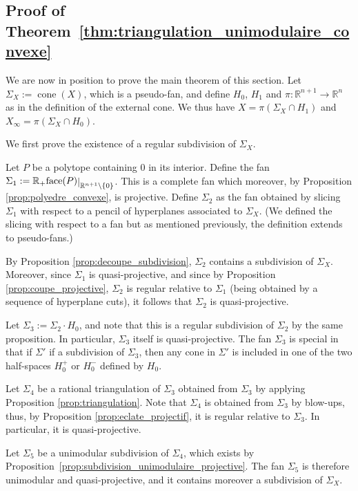\documentclass[11pt]{amsart}
\theoremstyle{definition}
\numberwithin{equation}{section}
\renewcommand{\~}{\widetilde}
\newcommand{\R}{\mathbb{R}}
\newcommand{\rest}[1]{\raisebox{-1pt}{$\vert$}_{#1}}
\newcommand{\cone}{\R_+} %
\DeclareMathOperator{\coneupop}{cone}
\newcommand{\coneup}[1]{\coneupop(#1)} %
\DeclareMathOperator{\faceop}{face}
\newcommand{\face}[1]{\faceop(#1)} %
\begin{document}
\subsection{Proof of Theorem~\ref{thm:triangulation_unimodulaire_convexe}}
We are now in position to prove the main theorem of this section. Let $\Sigma_X:=\coneup{X}$, which is a pseudo-fan, and define $H_0$, $H_1$ and $\pi\colon\R^{n+1}\to\R^n$ as in the definition of the external cone. We thus have $X=\pi(\Sigma_X\cap H_1)$ and $X_\infty=\pi(\Sigma_X\cap H_0)$.

\medskip

We first prove the existence of a regular subdivision of $\Sigma_X$.

\medskip

Let $P$ be a polytope containing $0$ in its interior. Define the fan $\Sigma_1:=\cone{\face{P}\rest{\R^{n+1}\setminus\{0\}}}$. This is a complete fan which moreover, by Proposition \ref{prop:polyedre_convexe}, is projective. Define $\Sigma_2$ as the fan obtained by slicing $\Sigma_1$ with respect to a pencil of hyperplanes associated to $\Sigma_X$. (We defined the slicing with respect to a fan but as mentioned previously, the definition extends to pseudo-fans.)

By Proposition \ref{prop:decoupe_subdivision}, $\Sigma_2$ contains a subdivision of $\Sigma_X$.
Moreover, since $\Sigma_1$ is quasi-projective, and since by Proposition \ref{prop:coupe_projective}, $\Sigma_2$ is regular relative to $\Sigma_1$ (being obtained by a sequence of hyperplane cuts), it follows that $\Sigma_2$ is quasi-projective.

\medskip

Let $\Sigma_3:=\Sigma_2\cdot H_0$, and note that this is a regular subdivision of $\Sigma_2$ by the same proposition. In particular, $\Sigma_3$ itself is quasi-projective. The fan $\Sigma_3$ is special in that if $\Sigma'$ if a subdivision of $\Sigma_3$, then any cone in $\Sigma'$ is included in one of the two half-spaces $H_0^+$ or $H_0^-$ defined by $H_0$.

\medskip

Let $\Sigma_4$ be a rational triangulation of $\Sigma_3$ obtained from $\Sigma_3$ by applying Proposition \ref{prop:triangulation}. Note that $\Sigma_4$ is obtained from $\Sigma_3$ by blow-ups, thus, by Proposition \ref{prop:eclate_projectif}, it is regular relative to $\Sigma_3$. In particular, it is quasi-projective.

\medskip

Let $\Sigma_5$ be a unimodular subdivision of $\Sigma_4$, which exists by Proposition~\ref{prop:subdivision_unimodulaire_projective}. The fan $\Sigma_5$ is therefore unimodular and quasi-projective, and it contains moreover a subdivision of $\Sigma_X$.
\end{document}
